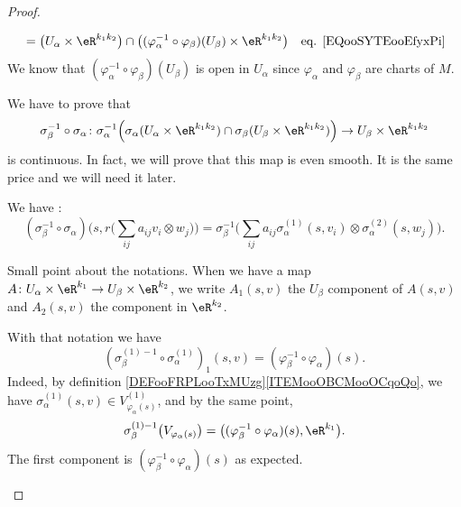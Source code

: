 \begin{proof}
\begin{subproof}
\begin{subequations}
\begin{align}
				 & = \big( U_{\alpha}\times \eR^{k_1k_2} \big) \cap \big(   (\varphi_{\alpha}^{-1}\circ\varphi_{\beta})(U_{\beta})   \times \eR^{k_1k_2} \big)                                                                            & \text{eq. \eqref{EQooSYTEooEfyxPi}}    \\
			\end{align}
		\end{subequations}
		We know that \( (\varphi_{\alpha}^{-1}\circ\varphi_{\beta})(U_\beta)\) is open in \( U_{\alpha}\) since \( \varphi_{\alpha}\) and \( \varphi_{\beta}\) are charts of \( M\).


		We have to prove that
		\begin{equation}
			\sigma_{\beta}^{-1}\circ\sigma_{\alpha}  \colon  \sigma_{\alpha}^{-1}\Big( \sigma_{\alpha}(U_{\alpha}\times \eR^{k_1k_2})\cap \sigma_{\beta}(U_{\beta}\times \eR^{k_1k_2}) \Big)      \to  U_{\beta}\times \eR^{k_1k_2}
		\end{equation}
		is continuous. In fact, we will prove that this map is even smooth. It is the same price and we will need it later.

		\begin{subproof}

			We have :
			\begin{equation}		\label{EQooNROCooARFfPa}
				(\sigma_{\beta}^{-1}\circ \sigma_{\alpha})\Big( s,r\big( \sum_{ij}a_{ij}v_i\otimes w_j \big)\Big)
				=\sigma_{\beta}^{-1}\Big( \sum_{ij}a_{ij}\sigma_{\alpha}^{(1)}(s,v_i)\otimes \sigma_{\alpha}^{(2)}(s,w_j) \Big).
			\end{equation}

			Small point about the notations. When we have a map \(A \colon U_{\alpha}\times \eR^{k_1}\to U_{\beta}\times \eR^{k_2}  \), we write \( A_1(s,v)\) the \( U_{\beta}\) component of \( A(s,v)\) and \( A_2(s,v)\) the component in \( \eR^{k_2}\).

			With that notation we have
			\begin{equation}		\label{EQooSBLDooRxPKQR}
				(\sigma_{\beta}^{(1)-1}\circ\sigma_{\alpha}^{(1)})_1(s,v)=(\varphi_{\beta}^{-1}\circ \varphi_{\alpha})(s).
			\end{equation}
			Indeed, by definition \ref{DEFooFRPLooTxMUzg}\ref{ITEMooOBCMooOCqoQo}, we have \( \sigma_{\alpha}^{(1)}(s,v)\in V_{\varphi_{\alpha}(s)}^{(1)}\), and by the same point,
			\begin{equation}
				\sigma_{\beta}^{(1)-1}\big( V_{\varphi_{\alpha}(s)} \big)=\big( (\varphi_{\beta}^{-1}\circ\varphi_{\alpha})(s), \eR^{k_1} \big).
			\end{equation}
			The first component is \( (\varphi_{\beta}^{-1}\circ \varphi_{\alpha})(s)\) as expected.


\end{subproof}
\end{subproof}
\end{proof}
